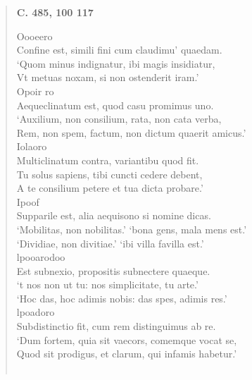 \documentclass[11pt, a4paper]{report}
\begin{document}
\begin{verse}
    \begin{center} \textbf{C. 485, 100 117} \end{center} \marginpar{[15]} Oooeero \\ Confine est, simili fini cum claudimu’ quaedam. \\ ‘Quom minus indignatur, ibi magis insidiatur, \\ Vt metuas noxam, si non ostenderit iram.’ \\ Opoir ro \\ Aequeclinatum est, quod casu promimus uno. \\ ‘Auxilium, non consilium, rata, non cata verba, \\ Rem, non spem, factum, non dictum quaerit amicus.’ \\ Iolaoro \\ Multiclinatum contra, variantibu quod fit. \\ Tu solus sapiens, tibi cuncti cedere debent, \\ A te consilium petere et tua dicta probare.’ \\ Ipoof \\ Supparile est, alia aequisono si nomine dicas. \\ ‘Mobilitas, non nobilitas.’ ‘bona gens, mala mens est.’ \\ ‘Dividiae, non divitiae.’ ‘ibi villa favilla est.’ \\ lpooarodoo \\ Est subnexio, propositis subnectere quaeque. \\ ‘t nos non ut tu: nos simplicitate, tu arte.’ \\ ‘Hoc das, hoc adimis nobis: das spes, adimis res.’ \\ lpoadoro \\ Subdistinctio fit, cum rem distinguimus ab re. \\ ‘Dum fortem, quia sit vaecors, comemque vocat se, \\ Quod sit prodigus, et clarum, qui infamis habetur.’ \\ 
        ﻿\pagebreak 

\end{verse}
\end{document}
